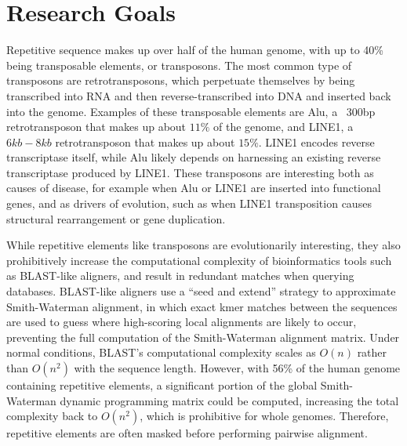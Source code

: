 \documentclass{article}
\begin{document}
\section{Research Goals}
Repetitive sequence makes up over half of the human genome, with up to 40\% being transposable elements, or transposons. The most common type of transposons are retrotransposons, which perpetuate themselves by being transcribed into RNA and then reverse-transcribed into DNA and inserted back into the genome. Examples of these transposable elements are Alu, a ~300bp retrotransposon that makes up about $11\%$ of the genome, and LINE1, a $6kb - 8kb$ retrotransposon that makes up about $15\%$. \cite{smit_origin_1996} LINE1 encodes reverse transcriptase itself, while Alu likely depends on harnessing an existing reverse transcriptase produced by LINE1. These transposons are interesting both as causes of disease, for example when Alu or LINE1 are inserted into functional genes, and as drivers of evolution, such as when LINE1 transposition causes structural rearrangement or gene duplication. \cite{kazazian_mobile_2004}

While repetitive elements like transposons are evolutionarily interesting, they also prohibitively increase the computational complexity of bioinformatics tools such as BLAST-like aligners, and result in redundant matches when querying databases. BLAST-like aligners use a “seed and extend” strategy to approximate Smith-Waterman alignment, in which exact kmer matches between the sequences are used to guess where high-scoring local alignments are likely to occur, preventing the full computation of the Smith-Waterman alignment matrix. Under normal conditions, BLAST’s computational complexity scales as $O(n)$ rather than $O(n^2)$ with the sequence length. However, with 56\% of the human genome containing repetitive elements, a significant portion of the global Smith-Waterman dynamic programming matrix could be computed, increasing the total complexity back to $O(n^2)$, which is prohibitive for whole genomes. Therefore, repetitive elements are often masked before performing pairwise alignment.
\end{document}

